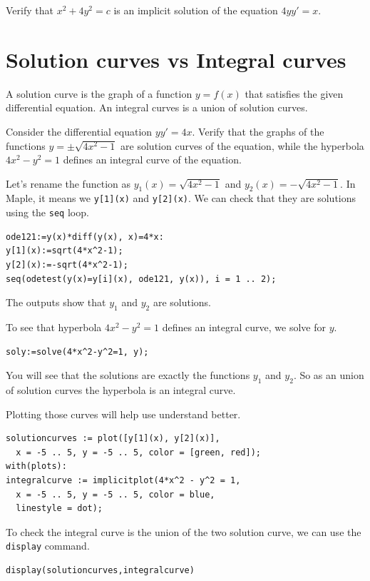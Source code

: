 \documentclass[
  12pt]{elegantbook}
\begin{document}
\begin{exercise}
Verify that \(x^2+4y^2=c\) is an implicit solution of the equation \(4yy'=x\).
\end{exercise}

\hypertarget{solution-curves-vs-integral-curves}{%
\section{Solution curves vs Integral curves}\label{solution-curves-vs-integral-curves}}

A solution curve is the graph of a function \(y=f(x)\) that satisfies the given differential equation. An integral curves is a union of solution curves.

\begin{example}
Consider the differential equation \(yy'=4x\). Verify that the graphs of the functions \(y=\pm\sqrt{4x^2-1}\) are solution curves of the equation, while the hyperbola \(4x^2-y^2=1\) defines an integral curve of the equation.
\end{example}

\begin{solution}

Let's rename the function as \(y_1(x)=\sqrt{4x^2-1}\) and \(y_2(x)=-\sqrt{4x^2-1}\). In Maple, it means we \texttt{y{[}1{]}(x)} and \texttt{y{[}2{]}(x)}. We can check that they are solutions using the \texttt{seq} loop.

\begin{verbatim}
ode121:=y(x)*diff(y(x), x)=4*x:
y[1](x):=sqrt(4*x^2-1);
y[2](x):=-sqrt(4*x^2-1);
seq(odetest(y(x)=y[i](x), ode121, y(x)), i = 1 .. 2);
\end{verbatim}

The outputs show that \(y_1\) and \(y_2\) are solutions.

To see that hyperbola \(4x^2-y^2=1\) defines an integral curve, we solve for \(y\).

\begin{verbatim}
soly:=solve(4*x^2-y^2=1, y);
\end{verbatim}

You will see that the solutions are exactly the functions \(y_1\) and \(y_2\). So as an union of solution curves the hyperbola is an integral curve.

Plotting those curves will help use understand better.

\begin{verbatim}
solutioncurves := plot([y[1](x), y[2](x)], 
  x = -5 .. 5, y = -5 .. 5, color = [green, red]);
with(plots):
integralcurve := implicitplot(4*x^2 - y^2 = 1, 
  x = -5 .. 5, y = -5 .. 5, color = blue, 
  linestyle = dot);
\end{verbatim}

To check the integral curve is the union of the two solution curve, we can use the \texttt{display} command.

\begin{verbatim}
display(solutioncurves,integralcurve)
\end{verbatim}

\end{solution}
\end{document}
